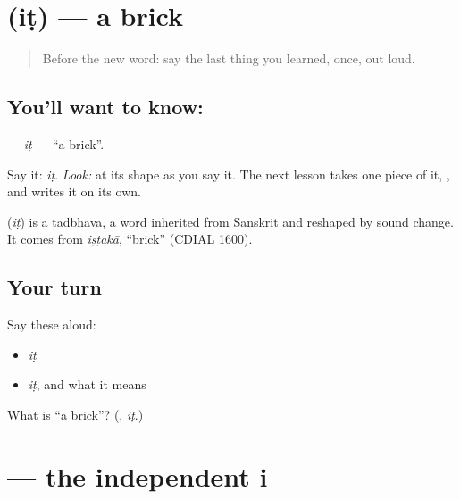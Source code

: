 \section[\texorpdfstring{\bn{ইট} (iṭ)}{ইট (iṭ)}]{ (iṭ) — a brick}

\label{lesson:BN-C04-it}



\begin{quote}
Before the new word: say the last thing you learned, once, out loud.
\end{quote}

\subsection*{You'll want to know: }
\textbf{} — \emph{iṭ} — \textquotedblleft{}a brick\textquotedblright{}.

Say it: \emph{iṭ}. \emph{Look:} at its shape as you say it. The next lesson takes one piece of it, \textbf{}, and writes it on its own.

\begin{cousinweb}
\textbf{} (\emph{iṭ}) is a tadbhava, a word inherited from Sanskrit and reshaped by sound change. It comes from \emph{iṣṭakā}, \textquotedblleft{}brick\textquotedblright{} (CDIAL 1600).
\end{cousinweb}

\subsection*{Your turn}
Say these aloud:

\begin{itemize}
\raggedright
  \item \emph{iṭ}
  \item \emph{iṭ}, and what it means
\end{itemize}

\begin{tcolorbox}[breakable,colback=teal!4,colframe=teal!35!black,title={Before you move on}]
What is \textquotedblleft{}a brick\textquotedblright{}? (\textbf{}, \emph{iṭ}.)
\end{tcolorbox}
\section[\texorpdfstring{\bn{ই} (i)}{ই (i)}]{ — the independent i}

\label{lesson:BN-W04-i-indep}



